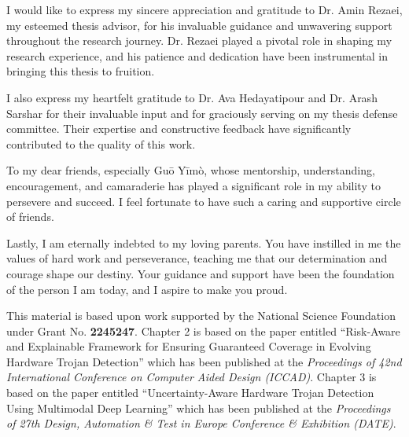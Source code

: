 \begingroup
\RaggedRight

I would like to express my sincere appreciation and gratitude to Dr. Amin Rezaei, my esteemed thesis advisor, for his invaluable guidance and unwavering support throughout the research journey. Dr. Rezaei played a pivotal role in shaping my research experience, and his patience and dedication have been instrumental in bringing this thesis to fruition.

I also express my heartfelt gratitude to Dr. Ava Hedayatipour and Dr. Arash Sarshar for their invaluable input and for graciously serving on my thesis defense committee. Their expertise and constructive feedback have significantly contributed to the quality of this work.

To my dear friends, especially Guō Yīmò, whose mentorship, understanding, encouragement, and camaraderie has played a significant role in my ability to persevere and succeed. I feel fortunate to have such a caring and supportive circle of friends.

Lastly, I am eternally indebted to my loving parents. You have instilled in me the values of hard work and perseverance, teaching me that our determination and courage shape our destiny. Your guidance and support have been the foundation of the person I am today, and I aspire to make you proud.

This material is based upon work supported by the National Science Foundation under Grant No. \textbf{2245247}. Chapter 2 is based on the paper entitled ``Risk-Aware and Explainable Framework for Ensuring Guaranteed Coverage in Evolving Hardware Trojan Detection'' \cite{Vishwakarma:ICCAD} which has been published at the \textit{Proceedings of 42nd International Conference on Computer Aided Design (ICCAD)}. Chapter 3 is based on the paper entitled ``Uncertainty-Aware Hardware Trojan Detection Using Multimodal Deep Learning'' \cite{Vishwakarma:DATE} which has been published at the \textit{Proceedings of 27th Design, Automation \& Test in Europe Conference \& Exhibition (DATE)}.




\endgroup
